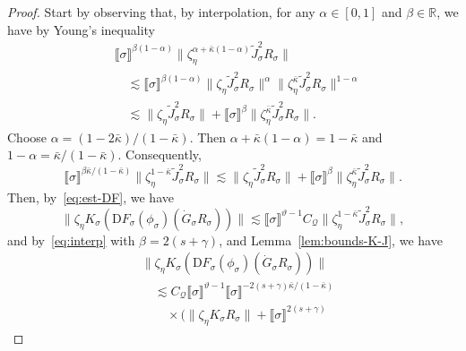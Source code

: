 \documentclass{article}
\numberwithin{equation}{section}
\newcommand{\mathD}{\mathrm{D}}
\theoremstyle{plain}
\theoremstyle{definition}
\begin{document}
\begin{proof}
  Start by observing that, by interpolation, for any $\alpha \in [0, 1]$ and
  $\beta \in \mathbb{R}$, we have by Young's inequality
  \begin{align*}
    &\llbracket \sigma \rrbracket^{\beta (1 - \alpha)}
    \| \zeta_{\eta}^{\alpha + \bar{\kappa} (1 - \alpha)}
    \tilde{J}_{\sigma}^2 R_{\sigma} \|\\
    &\quad \lesssim
    \llbracket \sigma \rrbracket^{\beta (1 - \alpha)}
    \| \zeta_{\eta} \tilde{J}_{\sigma}^2 R_{\sigma} \|^{\alpha}
    \| \zeta_{\eta}^{\bar{\kappa}}
    \tilde{J}_{\sigma}^2 R_{\sigma} \|^{1 - \alpha}\\
    &\quad \lesssim
    \| \zeta_{\eta} \tilde{J}_{\sigma}^2 R_{\sigma} \|
    + \llbracket \sigma \rrbracket^{\beta}
    \| \zeta_{\eta}^{\bar{\kappa}} \tilde{J}_{\sigma}^2 R_{\sigma} \| .
  \end{align*}
  Choose $\alpha = (1 - 2 \bar{\kappa}) / (1 - \bar{\kappa})$. Then $\alpha +
  \bar{\kappa} (1 - \alpha) = 1 - \bar{\kappa}$ and $1 - \alpha = \bar{\kappa}
  / (1 - \bar{\kappa})$. Consequently,
  \begin{equation}
    \llbracket \sigma \rrbracket^{\beta \bar{\kappa} / (1 - \bar{\kappa})} \|
    \zeta_{\eta}^{1 - \bar{\kappa}} \tilde{J}_{\sigma}^2 R_{\sigma} \| \lesssim
    \| \zeta_{\eta}  \tilde{J}_{\sigma}^2 R_{\sigma} \| + \llbracket \sigma
    \rrbracket^{\beta}  \| \zeta_{\eta}^{\bar{\kappa}} \tilde{J}_{\sigma}^2
    R_{\sigma} \| . \label{eq:interp}
  \end{equation}
  Then, by~\eqref{eq:est-DF}, we have
  \[ \| \zeta_{\eta} K_{\sigma} (\mathD F_{\sigma} (\phi_{\sigma})
     (\dot{G}_{\sigma} R_{\sigma})) \| \lesssim \llbracket \sigma
     \rrbracket^{\vartheta - 1} C_{\mathcal{Q}}  \| \zeta^{1 -
     \bar{\kappa}}_{\eta} \tilde{J}_{\sigma}^2 R_{\sigma} \|, \]
  and by~\eqref{eq:interp} with $\beta = 2 (s + \gamma)$, and
  Lemma~\ref{lem:bounds-K-J}, we have
  \begin{equation}
    \begin{aligned}
      &\| \zeta_{\eta} K_{\sigma}
      (\mathD F_{\sigma}(\phi_{\sigma})(\dot{G}_{\sigma} R_{\sigma})) \|\\
      &\quad \lesssim C_{\mathcal{Q}}
      \llbracket \sigma \rrbracket^{\vartheta - 1}
      \llbracket \sigma \rrbracket^{- 2 (s + \gamma)\bar{\kappa}
      / (1 - \bar{\kappa})}\\
      &\qquad \times
      \bigl(\| \zeta_{\eta} K_{\sigma} R_{\sigma} \|
      + \llbracket \sigma \rrbracket^{2 (s + \gamma)}

\end{aligned}
\end{equation}
\end{proof}
\end{document}
